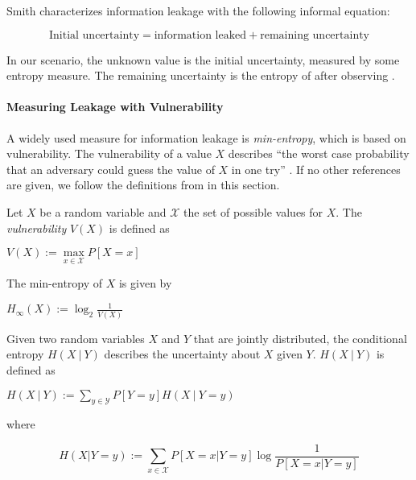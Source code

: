 Smith \cite{smith09} characterizes information leakage with the following informal equation:
\begin{center}
    \begin{equation}
        \text{Initial uncertainty} = \text{information leaked} + \text{remaining uncertainty}
    \end{equation}\label{eq:measure}
\end{center}
In our scenario, the unknown value \In is the initial uncertainty, measured by some entropy measure. The remaining uncertainty is the entropy of \In after observing \Out.

\paragraph*{Measuring Leakage with Vulnerability}
A widely used measure for information leakage is \emph{min-entropy}, which is based on vulnerability. The vulnerability of a value $X$ describes \enquote{the worst case probability that an adversary could guess the value of $X$ in one try} \cite{smith09}. If no other references are given, we follow the definitions from \cite{smith09} in this section.

\begin{definition}\label{def:vul}
    Let $X$ be a random variable and $\mathcal{X}$ the set of possible values for $X$. The \emph{vulnerability} $V(X)$ is defined as
    \begin{center}
        $V(X) := \max\limits_{x \in \mathcal{X}} P[X = x]$
    \end{center}
    The min-entropy of $X$ is given by
    \begin{center}
        $H_\infty (X) := \log_2 \frac{1}{V(X)}$
    \end{center}
\end{definition}

\begin{definition}
    Given two random variables $X$ and $Y$ that are jointly distributed, the conditional entropy $H(X \: | \: Y)$ describes the uncertainty about $X$ given $Y$. $H(X \: | \: Y)$ is defined as 
    \begin{center}
        $H(X \: | \: Y) := \sum\limits_{y \in \mathcal{Y}} P[Y = y] H(X \: | \: Y = y)$
    \end{center}
    where
    \begin{center}
        \begin{equation}\label{eq:dynEntropy}
        H(X | Y = y) := \sum\limits_{x \in \mathcal{X}} P[X = x | Y = y] \log \frac{1}{P[X = x | Y = y]}
    \end{equation}
    \end{center}
    
\end{definition}


